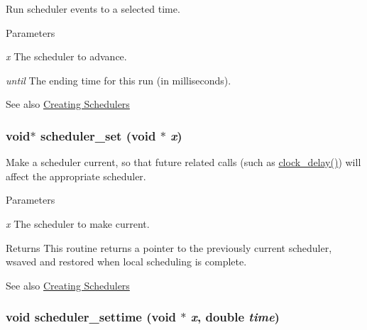 Run scheduler events to a selected time. 
\begin{DoxyParams}{Parameters}
\item[{\em x}]The scheduler to advance. \item[{\em until}]The ending time for this run (in milliseconds). \end{DoxyParams}
\begin{DoxySeeAlso}{See also}
\hyperlink{group__clocks_creating_schedulers}{Creating Schedulers} 
\end{DoxySeeAlso}
\hypertarget{group__clocks_gae6fc77faa65e6f80a26f072b2b17b31b}{
\subsubsection[{scheduler\_\-set}]{\setlength{\rightskip}{0pt plus 5cm}void$\ast$ scheduler\_\-set (void $\ast$ {\em x})}}
\label{group__clocks_gae6fc77faa65e6f80a26f072b2b17b31b}


Make a scheduler current, so that future related calls (such as \hyperlink{group__clocks_ga9ac56d198904627333de740743086920}{clock\_\-delay()}) will affect the appropriate scheduler. 
\begin{DoxyParams}{Parameters}
\item[{\em x}]The scheduler to make current. \end{DoxyParams}
\begin{DoxyReturn}{Returns}
This routine returns a pointer to the previously current scheduler, wsaved and restored when local scheduling is complete. 
\end{DoxyReturn}
\begin{DoxySeeAlso}{See also}
\hyperlink{group__clocks_creating_schedulers}{Creating Schedulers} 
\end{DoxySeeAlso}
\hypertarget{group__clocks_gade0e21336c4b2f33046669df0d210a48}{
\subsubsection[{scheduler\_\-settime}]{\setlength{\rightskip}{0pt plus 5cm}void scheduler\_\-settime (void $\ast$ {\em x}, \/  double {\em time})}}
\label{group__clocks_gade0e21336c4b2f33046669df0d210a48}


